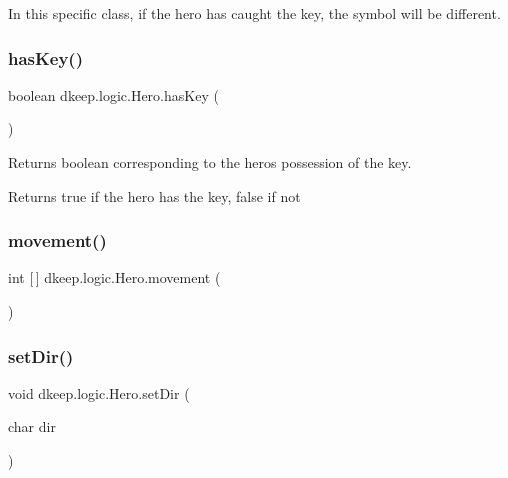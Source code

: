 In this specific class, if the hero has caught the key, the symbol will be different. \mbox{\label{classdkeep_1_1logic_1_1_hero_a5fc18a0a10613780cdc6b966dc8810f1}} 
\subsubsection{\texorpdfstring{has\+Key()}{hasKey()}}
{\footnotesize\ttfamily boolean dkeep.\+logic.\+Hero.\+has\+Key (\begin{DoxyParamCaption}{ }\end{DoxyParamCaption})}

Returns boolean corresponding to the hero\textquotesingle{}s possession of the key. \begin{DoxyReturn}{Returns}
true if the hero has the key, false if not 
\end{DoxyReturn}
\mbox{\label{classdkeep_1_1logic_1_1_hero_a5c9eff750321d53e1e4257fd9efd4cd6}} 
\subsubsection{\texorpdfstring{movement()}{movement()}}
{\footnotesize\ttfamily int \mbox{[}$\,$\mbox{]} dkeep.\+logic.\+Hero.\+movement (\begin{DoxyParamCaption}{ }\end{DoxyParamCaption})}

\mbox{\label{classdkeep_1_1logic_1_1_hero_a5fb6abc6ce91464833c67f143b4f913b}} 
\subsubsection{\texorpdfstring{set\+Dir()}{setDir()}}
{\footnotesize\ttfamily void dkeep.\+logic.\+Hero.\+set\+Dir (\begin{DoxyParamCaption}\item[{char}]{dir }\end{DoxyParamCaption})}

